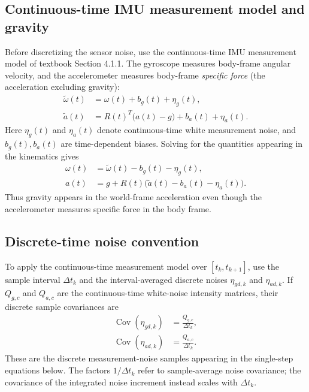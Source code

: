 \documentclass[11pt,a4paper]{article}
\begin{document}
\subsection{Continuous-time IMU measurement model and gravity}
Before discretizing the sensor noise, use the continuous-time IMU
measurement model of textbook Section 4.1.1. The gyroscope measures
body-frame angular velocity, and the accelerometer measures body-frame
\emph{specific force} (the acceleration excluding gravity):
\begin{subequations}\label{eq:imu_model}
\begin{align}
\tilde\omega(t)&=\omega(t)+b_g(t)+\eta_g(t),\\
\tilde a(t)&=R(t)^T\bigl(a(t)-g\bigr)+b_a(t)+\eta_a(t).
\end{align}
\end{subequations}
Here $\eta_g(t)$ and $\eta_a(t)$ denote continuous-time white
measurement noise, and $b_g(t),b_a(t)$ are time-dependent biases.
Solving for the quantities appearing in the kinematics gives
\begin{align}
\omega(t)&=\tilde\omega(t)-b_g(t)-\eta_g(t),\\
a(t)&=g+R(t)\bigl(\tilde a(t)-b_a(t)-\eta_a(t)\bigr).
\end{align}
Thus gravity appears in the world-frame acceleration even though the
accelerometer measures specific force in the body frame.

\subsection{Discrete-time noise convention}
To apply the continuous-time measurement model over
$[t_k,t_{k+1}]$, use the sample interval $\Delta t_k$ and the
interval-averaged discrete noises $\eta_{gd,k}$ and $\eta_{ad,k}$.
If $Q_{g,c}$ and $Q_{a,c}$ are the continuous-time white-noise
intensity matrices, their discrete sample covariances are
\begin{subequations}\label{eq:noise_discretization_intro}
\begin{align}
\operatorname{Cov}(\eta_{gd,k})&=\frac{Q_{g,c}}{\Delta t_k},\\
\operatorname{Cov}(\eta_{ad,k})&=\frac{Q_{a,c}}{\Delta t_k}.
\end{align}
\end{subequations}
These are the discrete measurement-noise samples appearing in the
single-step equations below. The factors $1/\Delta t_k$ refer to
sample-average noise covariance; the covariance of the integrated
noise increment instead scales with $\Delta t_k$.
\end{document}
